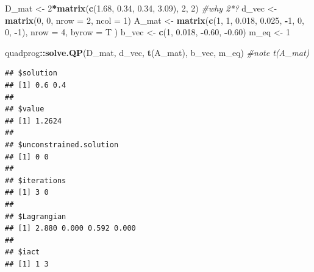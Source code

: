 \documentclass[11pt,]{article}
\newenvironment{Shaded}{\begin{snugshade}}{\end{snugshade}}
\newcommand{\KeywordTok}[1]{\textcolor[rgb]{0.13,0.29,0.53}{\textbf{#1}}}
\newcommand{\DataTypeTok}[1]{\textcolor[rgb]{0.13,0.29,0.53}{#1}}
\newcommand{\DecValTok}[1]{\textcolor[rgb]{0.00,0.00,0.81}{#1}}
\newcommand{\FloatTok}[1]{\textcolor[rgb]{0.00,0.00,0.81}{#1}}
\newcommand{\StringTok}[1]{\textcolor[rgb]{0.31,0.60,0.02}{#1}}
\newcommand{\CommentTok}[1]{\textcolor[rgb]{0.56,0.35,0.01}{\textit{#1}}}
\newcommand{\OperatorTok}[1]{\textcolor[rgb]{0.81,0.36,0.00}{\textbf{#1}}}
\newcommand{\NormalTok}[1]{#1}
\begin{document}
\begin{Shaded}
\begin{Highlighting}[]
\NormalTok{D_mat <-}\StringTok{ }\DecValTok{2}\OperatorTok{*}\KeywordTok{matrix}\NormalTok{(}\KeywordTok{c}\NormalTok{(}\FloatTok{1.68}\NormalTok{, }\FloatTok{0.34}\NormalTok{, }\FloatTok{0.34}\NormalTok{, }\FloatTok{3.09}\NormalTok{), }\DecValTok{2}\NormalTok{, }\DecValTok{2}\NormalTok{) }\CommentTok{#why 2*?}
\NormalTok{d_vec <-}\StringTok{ }\KeywordTok{matrix}\NormalTok{(}\DecValTok{0}\NormalTok{, }\DecValTok{0}\NormalTok{, }\DataTypeTok{nrow =} \DecValTok{2}\NormalTok{, }\DataTypeTok{ncol =} \DecValTok{1}\NormalTok{)}
\NormalTok{A_mat <-}\StringTok{ }\KeywordTok{matrix}\NormalTok{(}\KeywordTok{c}\NormalTok{(}\DecValTok{1}\NormalTok{, }\DecValTok{1}\NormalTok{, }\FloatTok{0.018}\NormalTok{, }\FloatTok{0.025}\NormalTok{, }\OperatorTok{-}\DecValTok{1}\NormalTok{, }\DecValTok{0}\NormalTok{, }\DecValTok{0}\NormalTok{, }\OperatorTok{-}\DecValTok{1}\NormalTok{), }
                \DataTypeTok{nrow =} \DecValTok{4}\NormalTok{, }
                \DataTypeTok{byrow =}\NormalTok{ T}
\NormalTok{                )}
\NormalTok{b_vec <-}\StringTok{ }\KeywordTok{c}\NormalTok{(}\DecValTok{1}\NormalTok{, }\FloatTok{0.018}\NormalTok{, }\OperatorTok{-}\FloatTok{0.60}\NormalTok{, }\OperatorTok{-}\FloatTok{0.60}\NormalTok{)}
\NormalTok{m_eq <-}\StringTok{ }\DecValTok{1}

\NormalTok{quadprog}\OperatorTok{::}\KeywordTok{solve.QP}\NormalTok{(D_mat, d_vec, }\KeywordTok{t}\NormalTok{(A_mat), b_vec, m_eq) }\CommentTok{#note t(A_mat)}
\end{Highlighting}
\end{Shaded}

\begin{verbatim}
## $solution
## [1] 0.6 0.4
## 
## $value
## [1] 1.2624
## 
## $unconstrained.solution
## [1] 0 0
## 
## $iterations
## [1] 3 0
## 
## $Lagrangian
## [1] 2.880 0.000 0.592 0.000
## 
## $iact
## [1] 1 3
\end{verbatim}
\end{document}
